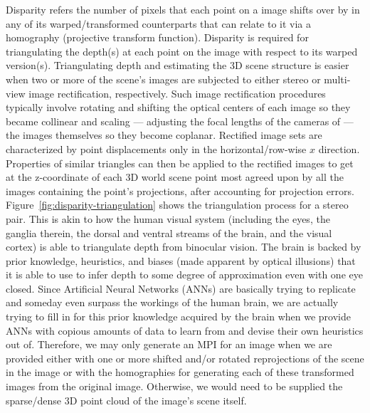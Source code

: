 Disparity refers the number of pixels that each point on a image shifts over by in any of its warped/transformed counterparts that can relate to it via a homography (projective transform function). Disparity is required for triangulating the depth(s) at each point on the image with respect to its warped version(s). Triangulating depth and estimating the 3D scene structure is easier when two or more of the scene's images are subjected to either stereo or multi-view image rectification, respectively. Such image rectification procedures typically involve rotating and shifting the optical centers of each image so they became collinear and scaling --- adjusting the focal lengths of the cameras of --- the images themselves so they become coplanar. Rectified image sets are characterized by point displacements only in the horizontal/row-wise $x$ direction. Properties of similar triangles can then be applied to the rectified images to get at the z-coordinate of each 3D world scene point most agreed upon by all the images containing the point's projections, after accounting for projection errors. Figure~\ref{fig:disparity-triangulation} shows the triangulation process for a stereo pair. This is akin to how the human visual system (including the eyes, the ganglia therein, the dorsal and ventral streams of the brain, and the visual cortex) is able to triangulate depth from binocular vision. The brain is backed by prior knowledge, heuristics, and biases (made apparent by optical illusions) that it is able to use to infer depth to some degree of approximation even with one eye closed. Since Artificial Neural Networks (ANNs) are basically trying to replicate and someday even surpass the workings of the human brain, we are actually trying to fill in for this prior knowledge acquired by the brain when we provide ANNs with copious amounts of data to learn from and devise their own heuristics out of. Therefore, we may only generate an MPI for an image when we are provided either with one or more shifted and/or rotated reprojections of the scene in the image or with the homographies for generating each of these transformed images from the original image. Otherwise, we would need to be supplied the sparse/dense 3D point cloud of the image's scene itself. 